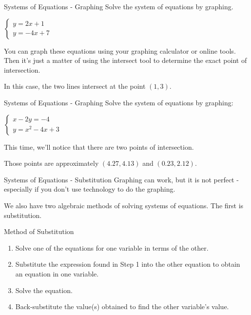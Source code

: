 \documentclass[t, aspectratio=169]{beamer}
\begin{document}
	\begin{frame}{Systems of Equations - Graphing}
		Solve the system of equations by graphing.
		
		$\begin{cases}
			y = 2x + 1 \\
			y = -4x + 7
		\end{cases}$
		
		\pause You can graph these equations using your graphing calculator or online tools. Then it's just a matter of using the intersect tool to determine the exact point of intersection.
		
		\pause In this case, the two lines intersect at the point $(1, 3)$.
	\end{frame}

	\begin{frame}{Systems of Equations - Graphing}
		Solve the system of equations by graphing:
		
		$\begin{cases}
		x - 2y = -4 \\
		y = x^2 - 4x + 3
		\end{cases}$ \pause
		
		This time, we'll notice that there are two points of intersection.
		
		\pause Those points are approximately $(4.27, 4.13)$ and $(0.23, 2.12)$.
	\end{frame}

	\begin{frame}{Systems of Equations - Substitution}
		Graphing can work, but it is not perfect - especially if you don't use technology to do the graphing. \pause
		
		We also have two algebraic methods of solving systems of equations. The first is substitution. \pause
		
		\begin{block}{Method of Substitution}
			\begin{enumerate}[1)]
				\item Solve one of the equations for one variable in terms of the other.
				\item Substitute the expression found in Step 1 into the other equation to obtain an equation in one variable.
				\item Solve the equation.
				\item Back-substitute the value(s) obtained to find the other variable's value.
			\end{enumerate}
		\end{block}
	\end{frame}
\end{document}
